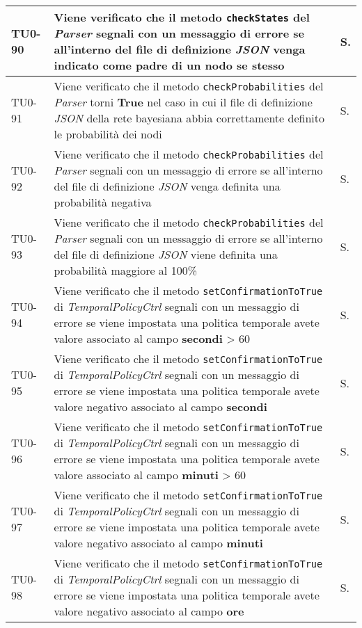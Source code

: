 \begin{longtable}{|C{.15\textwidth}|m{.66\textwidth}|C{.10\textwidth}|}
\hline
{}TU0-90 & Viene verificato che il metodo \texttt{checkStates} del \textit{Parser} segnali con un messaggio di errore se all'interno del file di definizione \textit{JSON} venga indicato come padre di un nodo se stesso & S.\\
\hline
TU0-91 & Viene verificato che il metodo \texttt{checkProbabilities} del \textit{Parser} torni \textbf{True} nel caso in cui il file di definizione \textit{JSON} della rete bayesiana abbia correttamente definito le probabilità dei nodi & S.\\
\hline
{}TU0-92 & Viene verificato che il metodo \texttt{checkProbabilities} del \textit{Parser} segnali con un messaggio di errore se all'interno del file di definizione \textit{JSON} venga definita una probabilità negativa & S.\\
\hline
TU0-93 & Viene verificato che il metodo \texttt{checkProbabilities} del \textit{Parser} segnali con un messaggio di errore se all'interno del file di definizione \textit{JSON} viene definita una probabilità maggiore al 100\% & S.\\
\hline
{}TU0-94 & Viene verificato che il metodo \texttt{setConfirmationToTrue} di \textit{TemporalPolicyCtrl} segnali con un messaggio di errore se viene impostata una politica temporale avete valore associato al campo \textbf{secondi} > 60 & S.\\
\hline
TU0-95 & Viene verificato che il metodo \texttt{setConfirmationToTrue} di \textit{TemporalPolicyCtrl} segnali con un messaggio di errore se viene impostata una politica temporale avete valore negativo associato al campo \textbf{secondi} & S.\\
\hline
{}TU0-96 & Viene verificato che il metodo \texttt{setConfirmationToTrue} di \textit{TemporalPolicyCtrl} segnali con un messaggio di errore se viene impostata una politica temporale avete valore associato al campo \textbf{minuti} > 60 & S.\\
\hline
TU0-97 & Viene verificato che il metodo \texttt{setConfirmationToTrue} di \textit{TemporalPolicyCtrl} segnali con un messaggio di errore se viene impostata una politica temporale avete valore negativo associato al campo \textbf{minuti} & S.\\
\hline
{}TU0-98 & Viene verificato che il metodo \texttt{setConfirmationToTrue} di \textit{TemporalPolicyCtrl} segnali con un messaggio di errore se viene impostata una politica temporale avete valore negativo associato al campo \textbf{ore} & S.\\

\end{longtable}
